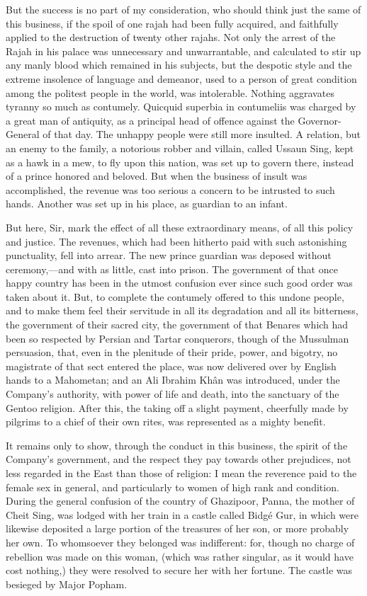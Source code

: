 But the success is no part of my consideration, who should think just the same of this business, if the spoil of one rajah had been fully acquired, and faithfully applied to the destruction of twenty other rajahs. Not only the arrest of the Rajah in his palace was unnecessary and unwarrantable, and calculated to stir up any manly blood which remained in his subjects, but the despotic style and the extreme insolence of language and demeanor, used to a person of great condition among the politest people in the world, was intolerable. Nothing aggravates tyranny so much as contumely. Quicquid superbia in contumeliis was charged by a great man of antiquity, as a principal head of offence against the Governor-General of that day. The unhappy people were still more insulted. A relation, but an enemy to the family, a notorious robber and villain, called Ussaun Sing, kept as a hawk in a mew, to fly upon this nation, was set up to govern there, instead of a prince honored and beloved. But when the business of insult was accomplished, the revenue was too serious a concern to be intrusted to such hands. Another was set up in his place, as guardian to an infant.

But here, Sir, mark the effect of all these extraordinary means, of all this policy and justice. The revenues, which had been hitherto paid with such astonishing punctuality, fell into arrear. The new prince guardian was deposed without ceremony,—and with as little, cast into prison. The government of that once happy country has been in the utmost confusion ever since such good order was taken about it. But, to complete the contumely offered to this undone people, and to make them feel their servitude in all its degradation and all its bitterness, the government of their sacred city, the government of that Benares which had been so respected by Persian and Tartar conquerors, though of the Mussulman persuasion, that, even in the plenitude of their pride, power, and bigotry, no magistrate of that sect entered the place, was now delivered over by English hands to a Mahometan; and an Ali Ibrahim Khân was introduced, under the Company's authority, with power of life and death, into the sanctuary of the Gentoo religion. After this, the taking off a slight payment, cheerfully made by pilgrims to a chief of their own rites, was represented as a mighty benefit.

It remains only to show, through the conduct in this business, the spirit of the Company's government, and the respect they pay towards other prejudices, not less regarded in the East than those of religion: I mean the reverence paid to the female sex in general, and particularly to women of high rank and condition. During the general confusion of the country of Ghazipoor, Panna, the mother of Cheit Sing, was lodged with her train in a castle called Bidgé Gur, in which were likewise deposited a large portion of the treasures of her son, or more probably her own. To whomsoever they belonged was indifferent: for, though no charge of rebellion was made on this woman, (which was rather singular, as it would have cost nothing,) they were resolved to secure her with her fortune. The castle was besieged by Major Popham.

